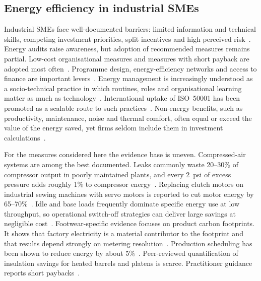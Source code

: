 \documentclass[processes,article,submit,pdftex,moreauthors]{Definitions/mdpi}
\begin{document}
\subsection{Energy efficiency in industrial SMEs}
Industrial SMEs face well-documented barriers: limited information and technical skills, competing investment priorities, split incentives and high perceived risk~\cite{cagno2013,trianni2017}. Energy audits raise awareness, but adoption of recommended measures remains partial. Low-cost organisational measures and measures with short payback are adopted most often~\cite{fleiter2012,kalantzis2019}. Programme design, energy-efficiency networks and access to finance are important levers~\cite{johansson2019,jalo2021,herce2024,zhang2025credit}. Energy management is increasingly understood as a socio-technical practice in which routines, roles and organisational learning matter as much as technology~\cite{thollander2025}. International uptake of ISO~50001 has been promoted as a scalable route to such practices~\cite{mckane2017,moreno2026}. Non-energy benefits, such as productivity, maintenance, noise and thermal comfort, often equal or exceed the value of the energy saved, yet firms seldom include them in investment calculations~\cite{worrell2003,nehler2016,nehler2018}.

For the measures considered here the evidence base is uneven. Compressed-air systems are among the best documented. Leaks commonly waste 20--30\% of compressor output in poorly maintained plants, and every 2~psi of excess pressure adds roughly 1\% to compressor energy~\cite{doe2016compressed,saidur2010,dindorf2012}. Replacing clutch motors on industrial sewing machines with servo motors is reported to cut motor energy by 65--70\%~\cite{nemesa2023}. Idle and base loads frequently dominate specific energy use at low throughput, so operational switch-off strategies can deliver large savings at negligible cost~\cite{mouzon2007,kara2011,gutowski2009}. Footwear-specific evidence focuses on product carbon footprints. It shows that factory electricity is a material contributor to the footprint and that results depend strongly on metering resolution~\cite{mila1998,cheah2013,zhang2026}. Production scheduling has been shown to reduce energy by about 5\%~\cite{sudhakar2025}. Peer-reviewed quantification of insulation savings for heated barrels and platens is scarce. Practitioner guidance reports short paybacks~\cite{kent2018}.
\end{document}

